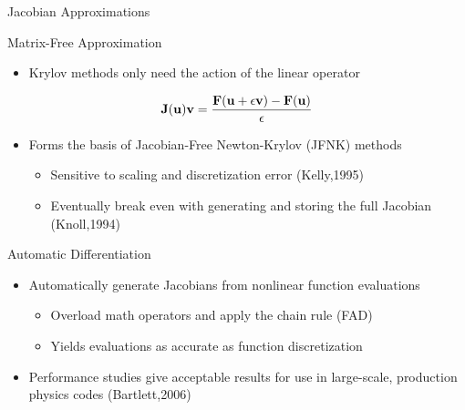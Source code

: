 \documentclass{beamer}
\begin{document}
\begin{frame}{Jacobian Approximations}

  \begin{beamerboxesrounded}[upper=boxheadcolor,lower=boxbodycolor,shadow=true]
    {Matrix-Free Approximation}
    \begin{itemize}
    \item Krylov methods only need the action of the linear operator
    \end{itemize}

    \[
    \mathbf{J}(\mathbf{u})\mathbf{v} = \frac{\mathbf{F}(\mathbf{u} + \epsilon \mathbf{v}) -
      \mathbf{F}(\mathbf{u})}{\epsilon}
    \]

    \begin{itemize}
    \item Forms the basis of Jacobian-Free Newton-Krylov (JFNK) methods
      \begin{itemize}
      \item Sensitive to scaling and discretization error (Kelly,1995)
      \item Eventually break even with generating and storing the full
        Jacobian (Knoll,1994)
      \end{itemize}
    \end{itemize}
  \end{beamerboxesrounded}

  \begin{beamerboxesrounded}[upper=boxheadcolor,lower=boxbodycolor,shadow=true]
    {Automatic Differentiation}
    \begin{itemize}
    \item Automatically generate Jacobians from nonlinear function
      evaluations
      \begin{itemize}
      \item Overload math operators and apply the chain rule (FAD)
      \item Yields evaluations as accurate as function discretization
      \end{itemize}
    \item Performance studies give acceptable results for use in
      large-scale, production physics codes (Bartlett,2006)
    \end{itemize}
  \end{beamerboxesrounded}

\end{frame}
\end{document}
